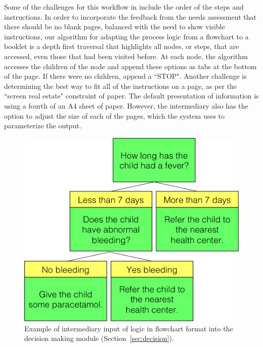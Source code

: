\documentclass{sig-alternate}
\begin{document}
Some of the challenges for this workflow in \nifty include the order of the steps and instructions. In order to incorporate the feedback from the needs assessment that there should be no blank pages, balanced with the need to show visible instructions, our algorithm for adapting the process logic from a flowchart to a booklet is a depth first traversal that highlights all nodes, or steps, that are accessed, even those that had been visited before. At each node, the algorithm accesses the children of the node and append these options as tabs at the bottom of the page. If there were no children, append a ``STOP". Another challenge is determining the best way to fit all of the instructions on a page, as per the ``screen real estate" constraint of paper. The default presentation of information is using a fourth of an A4 sheet of paper. However, the intermediary also has the option to adjust the size of each of the pages, which the system uses to parameterize the output.


\begin{figure}
\centering
\includegraphics[width=.6\linewidth]{img/flowchart-input.png}
\caption{Example of intermediary input of logic in flowchart format into the decision making module (Section~\ref{sec:decision}).}
\label{fig:flowchart-input}
\end{figure}


\end{document}
